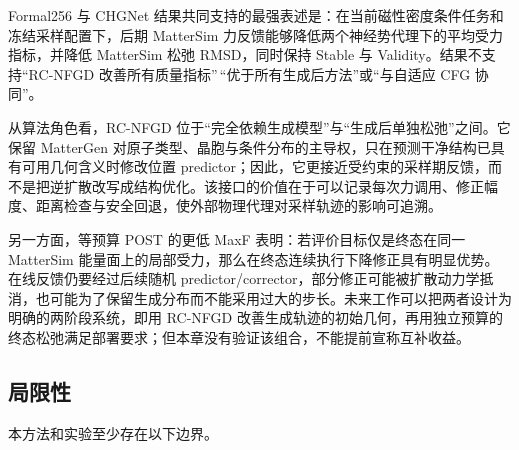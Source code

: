 Formal256 与 CHGNet 结果共同支持的最强表述是：在当前磁性密度条件任务和冻结采样配置下，后期 Matter\allowbreak Sim 力反馈能够降低两个神经势代理下的平均受力指标，并降低 Matter\allowbreak Sim 松弛 RMSD，同时保持 Stable 与 Validity。结果不支持``RC-NFGD 改善所有质量指标''\,``优于所有生成后方法''或``与自适应 CFG 协同''。

从算法角色看，RC-NFGD 位于``完全依赖生成模型''与``生成后单独松弛''之间。它保留 MatterGen 对原子类型、晶胞与条件分布的主导权，只在预测干净结构已具有可用几何含义时修改位置 predictor；因此，它更接近受约束的采样期反馈，而不是把逆扩散改写成结构优化。该接口的价值在于可以记录每次力调用、修正幅度、距离检查与安全回退，使外部物理代理对采样轨迹的影响可追溯。

另一方面，等预算 POST 的更低 MaxF 表明：若评价目标仅是终态在同一 Matter\allowbreak Sim 能量面上的局部受力，那么在终态连续执行下降修正具有明显优势。在线反馈仍要经过后续随机 predictor/corrector，部分修正可能被扩散动力学抵消，也可能为了保留生成分布而不能采用过大的步长。未来工作可以把两者设计为明确的两阶段系统，即用 RC-NFGD 改善生成轨迹的初始几何，再用独立预算的终态松弛满足部署要求；但本章没有验证该组合，不能提前宣称互补收益。

\subsection{局限性}

本方法和实验至少存在以下边界。

